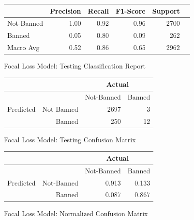 \documentclass[11pt]{article}[twocolumn]
\begin{document}
\begin{figure}[H]
\begin{center}
\caption{Focal Loss Model: Testing Classification Report}\label{test-classification}
\begin{tabular}{|l|r|r|r|r|r}
\hline
    & Precision & Recall & F1-Score & Support \\
    \hline
    Not-Banned  & 1.00 & 0.92 & 0.96 & 2700\\
    Banned  & 0.05 & 0.80 & 0.09 & 262\\
    \hline
    Macro Avg  & 0.52 & 0.86 & 0.65 & 2962\\
    \hline
\end{tabular}
\end{center}
\end{figure}


\begin{figure}[H]
\begin{center}
\caption{Focal Loss Model: Testing Confusion Matrix}\label{test-confusion}
\begin{tabular}{|r|r|r|r|}
    \hline
    & & \multicolumn{2}{c|}{Actual}\\
        \hline
    \multirow{3}{*}{Predicted} &
    & Not-Banned & Banned \\
    \hline
    & Not-Banned  & 2697 & 3\\
    & Banned  & 250 & 12\\
    \hline
\end{tabular}
\end{center}
\end{figure}



\begin{figure}[H]
\begin{center}
\caption{Focal Loss Model: Normalized Confusion Matrix}
\begin{tabular}{|r|r|r|r|}
    \hline
    & & \multicolumn{2}{c|}{Actual}\\
        \hline
    \multirow{3}{*}{Predicted} &
    & Not-Banned & Banned \\
    \hline
    & Not-Banned  & 0.913 & 0.133\\
    & Banned  & 0.087 & 0.867\\
    \hline
\end{tabular}
\end{center}
\end{figure}
\end{document}
